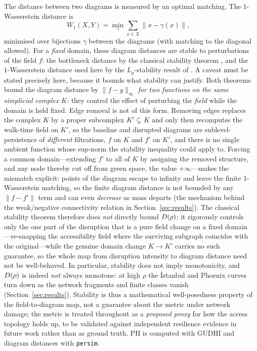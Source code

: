 The distance between two diagrams is measured by an optimal matching. The
$1$-Wasserstein distance is
\[
W_1(X,Y)=\min_{\gamma}\sum_{x\in X}\lVert x-\gamma(x)\rVert,
\]
minimised over bijections $\gamma$ between the diagrams (with matching to the
diagonal allowed). For a \emph{fixed} domain, these diagram distances are stable to
perturbations of the field $f$: the bottleneck distance by the classical stability
theorem \citep{cohensteiner2007stability}, and the $1$-Wasserstein distance used here
by the $L_p$-stability result of \citet{cohensteiner2010lpstable}. A caveat must be
stated precisely here, because it bounds what stability can justify. Both theorems
bound the diagram distance by $\lVert f-g\rVert_\infty$ \emph{for two functions on the
same simplicial complex} $K$: they control the effect of perturbing the \emph{field}
while the domain is held fixed. Edge removal is not of this form. Removing edges
replaces the complex $K$ by a proper subcomplex $K'\subsetneq K$ and only then
recomputes the walk-time field on $K'$, so the baseline and disrupted diagrams are
sublevel-persistence of \emph{different} filtrations, $f$ on $K$ and $f'$ on $K'$, and
there is no single ambient function whose sup-norm the stability inequality could
apply to. Forcing a common domain---extending $f'$ to all of $K$ by assigning the
removed structure, and any node thereby cut off from green space, the value
$+\infty$---makes the mismatch explicit: points of the diagram escape to infinity and
leave the finite $1$-Wasserstein matching, so the finite diagram distance is not
bounded by any $\lVert f-f'\rVert$ term and can even \emph{decrease} as mass departs
(the mechanism behind the weak/negative connectivity relation in
Section~\ref{sec:results}). The classical stability theorem therefore does
\emph{not} directly bound $D(\rho)$: it rigorously controls only the one part of the
disruption that is a pure field change on a fixed domain---re-snapping the
accessibility field where the surviving subgraph coincides with the original---while
the genuine domain change $K\to K'$ carries no such guarantee, so the whole map from
disruption intensity to diagram distance need not be well-behaved. In particular, stability does not imply
monotonicity, and $D(\rho)$ is indeed \emph{not} always monotone: at high $\rho$ the
İstanbul and Phoenix curves turn down as the network fragments and finite classes
vanish (Section~\ref{sec:results}). Stability is thus a mathematical well-posedness
property of the field-to-diagram map, not a guarantee about the metric under network
damage; the metric is treated throughout as a \emph{proposed proxy} for how the
access topology holds up, to be validated against independent resilience evidence in
future work rather than as ground truth. PH is computed with GUDHI \citep{gudhi} and diagram distances with
\texttt{persim}.

